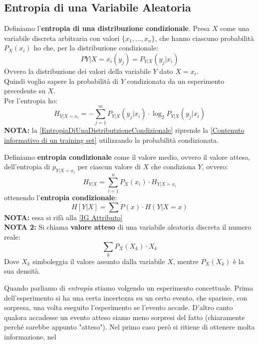 \subsection{Entropia di una Variabile Aleatoria}
\begin{definizione}
  Definiamo l'\textbf{entropia di una distribuzione condizionale}. Presa $X$
  come una variabile discreta arbitraria con valori $\{x_1,\ldots, x_n\}$, che
  hanno ciascuno probabilità $P_X(x_i)$ ho che, per la distribuzione
  condizionale:
  \[P{Y|X=x_i}(y_j)=P_{Y|X}(y_j|x_i)\]
  Ovvero la distribuzione dei valori della variabile $Y$ dato $X=x_i$.\\
  Quindi voglio sapere la probabilità di $Y$ condizionata da un esperimento
  precedente su $X$.\\
  Per l'entropia ho:
\begin{equation}
  H_{Y|X=x_i}=-\sum_{j=1}^m P_{Y|X}(y_j|x_i)\cdot \log_2 P_{Y|X}(y_j|x_i)
  \label{EntropiaDiUnaDistributzioneCondizionale}
\end{equation}
\textbf{NOTA:} la \ref{EntropiaDiUnaDistributzioneCondizionale} riprende la \ref{Contenuto informativo di un training set} utilizzando la probabilità condizionata.
\end{definizione}
\begin{definizione}
  Definiamo \textbf{entropia condizionale} come il valore medio, ovvero il
  valore atteso, dell'entropia di $p_{Y|X=x_i}$ per ciascun valore di $X$ che
  condiziona $Y$, ovvero:
  \[H_{Y|X}=\sum_{i=1}^n P_X(x_i)\cdot H_{Y|X=x_i}\]
  ottenendo l'\textbf{entropia condizionale}:
  \begin{equation}
      H[Y|X]=\sum P(x)\cdot H(Y|X=x)
        \label{EntropiaCondizionale}
  \end{equation}
  \textbf{NOTA:} essa si rifà alla \ref{IG Attributo}\\
  \textbf{NOTA 2:} Si chiama \textbf{valore atteso} di una variabile aleatoria discreta il numero reale:
  \[\sum_{k} P_X(X_k)\cdot X_k\]
  Dove $X_k$ simboleggia il valore assunto dalla variabile $X$, mentre $P_X(X_k)$ è la sua densità. 
\end{definizione}
Quando parliamo di \textit{entropia} stiamo volgendo un esperimento
concettuale. Prima dell'esperimento si ha una certa incertezza su un certo
evento, che sparisce, con sorpresa, una volta eseguito l'esperimento se l'evento
accade. D'altro canto qualora accadesse un evento atteso siamo meno sorpresi del
fatto (chiaramente perché sarebbe appunto "atteso"). Nel primo caso però si ritiene di ottenere molta informazione, nel
